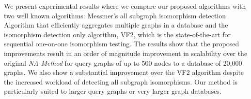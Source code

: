 We present experimental results where we compare our proposed algorithms with two well known algorithms: Messmer's all subgraph isomorphism detection Algorithm that efficiently aggregates multiple graphs in a database and the isomorphism detection only algorithm, VF2, which is the state-of-the-art for sequential one-on-one isomorphism testing. The results show that the proposed improvements result in an order of magnitude improvement in scalability over the original \textit{NA Method}  for query graphs of up to 500 nodes to a database of 20,000 graphs. We also show a substantial improvement over the VF2 algorithm despite the increased workload of detecting all subgraph isomorphisms. Our method is particularly suited to larger query graphs or very larger graph databases.

